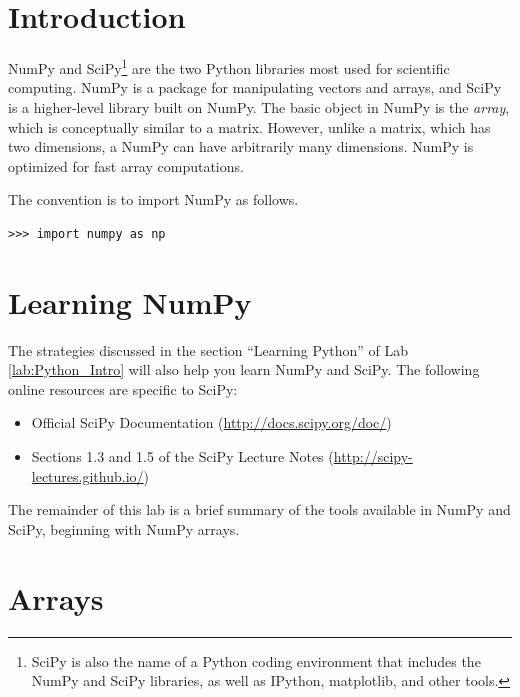 \label{lab:NumPyArrays}

\section*{Introduction}

NumPy and SciPy\footnote{SciPy is also the name of a Python coding environment that includes the NumPy and SciPy libraries, as well as IPython, matplotlib, and other tools.} 
are the two Python libraries most used for scientific computing. 
NumPy is a package for manipulating vectors and arrays, and SciPy is a higher-level library built on NumPy. 
The basic object in NumPy is the \emph{array}, which is conceptually similar to a matrix. 
However, unlike a matrix, which has two dimensions, a NumPy  can have arbitrarily many dimensions. 
NumPy is optimized for fast array computations.

The convention is to import NumPy as follows.

\begin{lstlisting}
>>> import numpy as np
\end{lstlisting}

\section*{Learning NumPy}
The strategies discussed in the section ``Learning Python'' of Lab \ref{lab:Python_Intro} will also help you learn NumPy and SciPy. 
The following online resources are specific to SciPy:
\begin{itemize}
\item Official SciPy Documentation (\url{http://docs.scipy.org/doc/})
\item Sections 1.3 and 1.5 of the SciPy Lecture Notes (\url{http://scipy-lectures.github.io/})
\end{itemize}
The remainder of this lab is a brief summary of the tools available in NumPy and SciPy, beginning with NumPy arrays.


\section*{Arrays}

